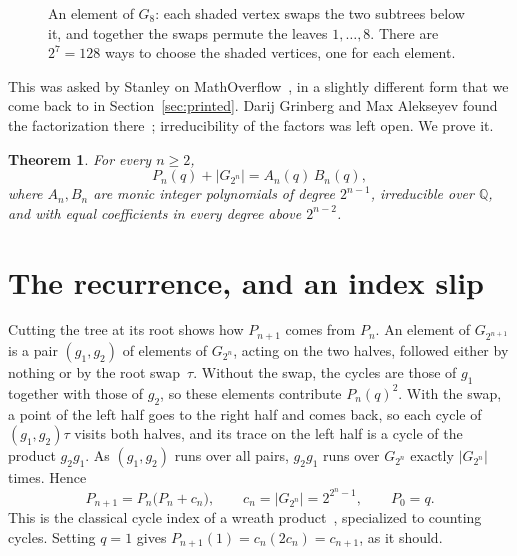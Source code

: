 \documentclass[11pt]{article}
\newtheorem{theorem}{Theorem}
\theoremstyle{remark}
\begin{document}
\begin{figure}[h]
\centering
{}
\caption{An element of $G_8$: each shaded vertex swaps the two subtrees below it, and together the swaps permute the leaves $1,\dots,8$. There are $2^7=128$ ways to choose the shaded vertices, one for each element.}
\label{fig:tree}
\end{figure}

This was asked by Stanley on MathOverflow~\cite{MO}, in a slightly different form that we come back to in Section~\ref{sec:printed}. Darij Grinberg and Max Alekseyev found the factorization there~\cite{Grinberg,Alekseyev}; irreducibility of the factors was left open. We prove it.

\begin{theorem}\label{thm:main}
For every $n\ge2$,
\[
P_n(q)+|G_{2^n}|=A_n(q)\,B_n(q),
\]
where $A_n,B_n$ are monic integer polynomials of degree $2^{n-1}$, irreducible over $\mathbb Q$, and with equal coefficients in every degree above $2^{n-2}$.
\end{theorem}

\section{The recurrence, and an index slip}

Cutting the tree at its root shows how $P_{n+1}$ comes from $P_n$. An element of $G_{2^{n+1}}$ is a pair $(g_1,g_2)$ of elements of $G_{2^n}$, acting on the two halves, followed either by nothing or by the root swap~$\tau$. Without the swap, the cycles are those of $g_1$ together with those of $g_2$, so these elements contribute $P_n(q)^2$. With the swap, a point of the left half goes to the right half and comes back, so each cycle of $(g_1,g_2)\tau$ visits both halves, and its trace on the left half is a cycle of the product $g_2g_1$. As $(g_1,g_2)$ runs over all pairs, $g_2g_1$ runs over $G_{2^n}$ exactly $|G_{2^n}|$ times. Hence
\begin{equation}\label{eq:rec}
P_{n+1}=P_n\bigl(P_n+c_n\bigr),\qquad c_n=|G_{2^n}|=2^{2^n-1},\qquad P_0=q .
\end{equation}
This is the classical cycle index of a wreath product~\cite{Polya}, specialized to counting cycles. Setting $q=1$ gives $P_{n+1}(1)=c_n(2c_n)=c_{n+1}$, as it should.
\end{document}
